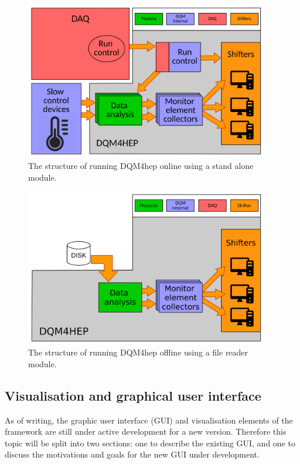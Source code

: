 \begin{figure}
	\centering
	\includegraphics[width=0.95\textwidth]{../Pictures/StandaloneModuleArchitecture.pdf}
	\caption{The structure of running DQM4hep online using a stand alone module.}
	\label{figure:daq/dqm4hep/standalone-module}
\end{figure}

\begin{figure}
	\centering
	\includegraphics[width=0.95\textwidth]{../Pictures/FileReaderModuleArchitecture.pdf}
	\caption{The structure of running DQM4hep offline using a file reader module.}
	\label{figure:daq/dqm4hep/file-reader}
\end{figure}

\subsection{Visualisation and graphical user interface} %
As of writing, the graphic user interface (GUI) and visualisation elements of the framework are still under active development for a new version. Therefore this topic will be split into two sections: one to describe the existing GUI, and one to discuss the motivations and goals for the new GUI under development. 

